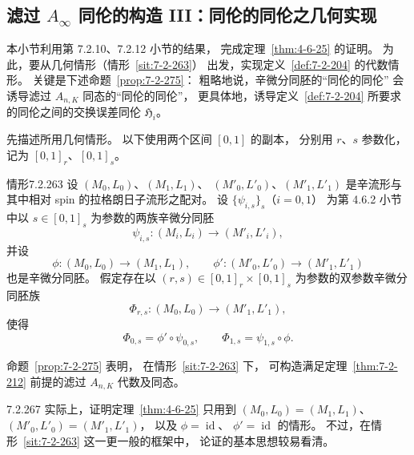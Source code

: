 
\subsection{滤过 $A_\infty$ 同伦的构造 III：同伦的同伦之几何实现}
\label{subsec:7-2-13}

本小节利用第 7.2.10、7.2.12 小节的结果，
完成定理~\ref{thm:4-6-25} 的证明。
为此，要从几何情形（情形~\ref{sit:7-2-263}）
出发，实现定义~\ref{def:7-2-204} 的代数情形。
关键是下述命题~\ref{prop:7-2-275}：
粗略地说，辛微分同胚的“同伦的同伦”
会诱导滤过 $A_{n,K}$ 同态的“同伦的同伦”，
更具体地，诱导定义~\ref{def:7-2-204}
所要求的同伦之间的交换误差同伦 $\mathfrak H_i$。

先描述所用几何情形。
以下使用两个区间 $[0,1]$ 的副本，
分别用 $r$、$s$ 参数化，记为
$[0,1]_r$、$[0,1]_s$。

\begin{statement}{情形}{7.2.263}\label{sit:7-2-263}
设 $(M_0,L_0)$、$(M_1,L_1)$、
$(M'_0,L'_0)$、$(M'_1,L'_1)$
是辛流形与其中相对 spin 的拉格朗日子流形之配对。
设 $\{\psi_{i,s}\}_s$（$i=0,1$）
为第 4.6.2 小节中以 $s\in[0,1]_s$
为参数的两族辛微分同胚
\[
\psi_{i,s}\colon(M_i,L_i)\longrightarrow(M'_i,L'_i),
\]
并设
\begin{equation}
\phi\colon(M_0,L_0)\longrightarrow(M_1,L_1),
\qquad
\phi'\colon(M'_0,L'_0)\longrightarrow(M'_1,L'_1)
\tag{7.2.264}\label{eq:7-2-264}
\end{equation}
也是辛微分同胚。
假定存在以 $(r,s)\in[0,1]_r\times[0,1]_s$
为参数的双参数辛微分同胚族
\begin{equation}
\Phi_{r,s}\colon(M_0,L_0)\longrightarrow(M'_1,L'_1),
\tag{7.2.265}\label{eq:7-2-265}
\end{equation}
使得
\begin{equation}
\Phi_{0,s}=\phi'\circ\psi_{0,s},
\qquad
\Phi_{1,s}=\psi_{1,s}\circ\phi.
\tag{7.2.266}\label{eq:7-2-266}
\end{equation}
\end{statement}

命题~\ref{prop:7-2-275} 表明，
在情形~\ref{sit:7-2-263} 下，
可构造满足定理~\ref{thm:7-2-212}
前提的滤过 $A_{n,K}$ 代数及同态。

\begin{remark}{7.2.267}\label{rem:7-2-267}
实际上，证明定理~\ref{thm:4-6-25}
只用到
$(M_0,L_0)=(M_1,L_1)$、
$(M'_0,L'_0)=(M'_1,L'_1)$，
以及 $\phi=\operatorname{id}$、
$\phi'=\operatorname{id}$ 的情形。
不过，在情形~\ref{sit:7-2-263}
这一更一般的框架中，
论证的基本思想较易看清。
\end{remark}

